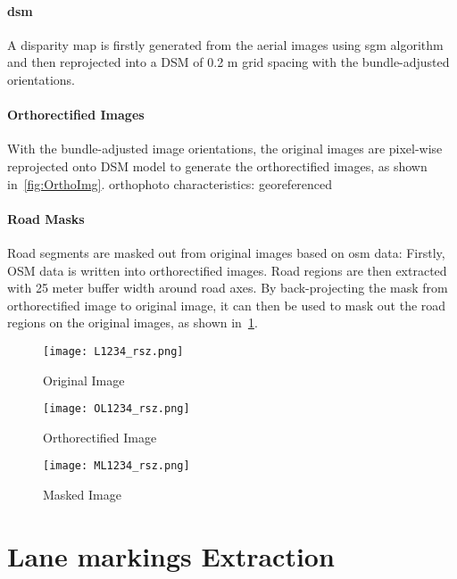 
\paragraph{\gls{dsm}}
A disparity map is firstly generated from the aerial images using \gls{sgm} algorithm and then reprojected into a DSM of 0.2 m grid spacing with the bundle-adjusted orientations.

\paragraph{Orthorectified Images}
With the bundle-adjusted image orientations, the original images are pixel-wise reprojected onto DSM model to generate the orthorectified images, as shown in~\cref{fig:OrthoImg}.
orthophoto characteristics:
georeferenced

\paragraph{Road Masks}
Road segments are masked out from original images based on \gls{osm} data: Firstly, OSM data is written into orthorectified images. Road regions are then extracted with 25 meter buffer width around road axes. By back-projecting the mask from orthorectified image to original image, it can then be used to mask out the road regions on the original images, as shown in~\cref{fig:MaskedImg}.

\begin{figure}%
  \parbox{.45\linewidth}{
    \centering
    \texttt{[image: L1234\_rsz.png]}
    \caption{Original Image}
    \label{fig:OriImg}
  }
  \hfill
  \parbox{.45\linewidth}{
    \centering
    \texttt{[image: OL1234\_rsz.png]}
    \caption{Orthorectified Image}
    \label{fig:OrthoImg}
  }
    \centering
    \texttt{[image: ML1234\_rsz.png]}
    \caption{Masked Image}
    \label{fig:MaskedImg}
\end{figure}

\clearpage

\section{Lane markings Extraction}
\label{sec:LineExtraction}


